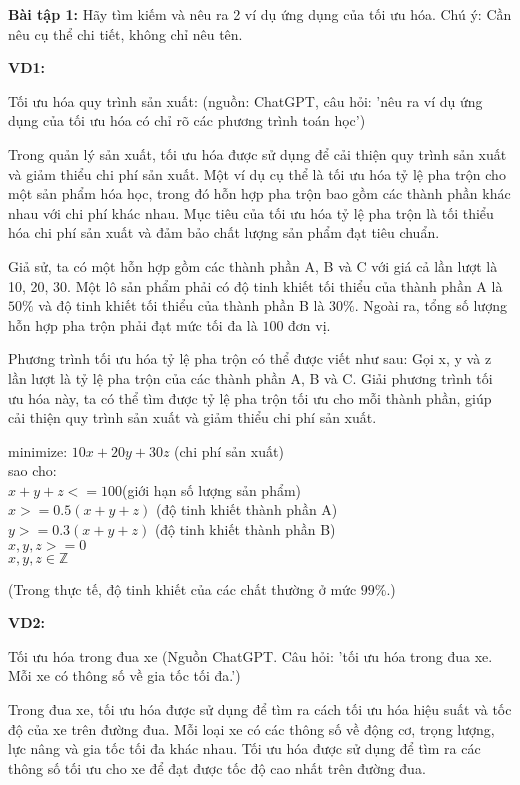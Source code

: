 \textbf{Bài tập 1:}
Hãy tìm kiếm và nêu ra 2 ví dụ ứng dụng của tối ưu hóa.
Chú ý: Cần nêu cụ thể chi tiết, không chỉ nêu tên.

\textbf{VD1:} 

Tối ưu hóa quy trình sản xuất: (nguồn: ChatGPT, câu hỏi: 'nêu ra ví dụ
 ứng dụng của tối ưu hóa có chỉ rõ các phương trình toán học')

Trong quản lý sản xuất, tối ưu hóa được 
sử dụng để cải thiện quy trình sản xuất và giảm thiểu chi phí sản xuất.
 Một ví dụ cụ thể là tối ưu hóa tỷ lệ pha trộn cho một sản phẩm hóa học, 
 trong đó hỗn hợp pha trộn bao gồm các thành phần khác nhau với chi phí 
 khác nhau. Mục tiêu của tối ưu hóa tỷ lệ pha trộn là tối thiểu hóa chi
phí sản xuất và đảm bảo chất lượng sản phẩm đạt tiêu chuẩn.

Giả sử, ta có một hỗn hợp gồm các thành phần A, B và C với giá
 cả lần lượt là 10, 20, 30. 
 Một lô sản phẩm phải có độ tinh khiết tối thiểu của thành phần A là $50\%$
  và độ tinh khiết tối thiểu của thành phần B là $30\%$.
 Ngoài ra, tổng số lượng hỗn hợp pha trộn phải đạt mức tối 
 đa là $100$ đơn vị.


Phương trình tối ưu hóa tỷ lệ pha trộn có thể được viết như sau:
Gọi x, y và z lần lượt là tỷ lệ pha trộn của các thành phần A, B và C.
 Giải phương trình tối ưu hóa này, ta có thể tìm được
  tỷ lệ pha trộn tối ưu cho mỗi thành phần, giúp cải thiện quy trình sản xuất và giảm thiểu chi phí sản xuất.

minimize: $10x + 20y + 30z$ (chi phí sản xuất)\\
sao cho:\\
$x + y + z <= 100 $(giới hạn số lượng sản phẩm)\\
$x >= 0.5(x+y+z)$ (độ tinh khiết thành phần A)\\
$y >= 0.3(x+y+z)$ (độ tinh khiết thành phần B)\\
$x,y,z >= 0 $\\
$x,y,z \in \mathbb{Z}$

(Trong thực tế, độ tinh khiết của các chất thường ở mức $99\%$.)

\textbf{VD2:} 

Tối ưu hóa trong đua xe (Nguồn ChatGPT. Câu hỏi: 
'tối ưu hóa trong đua xe. Mỗi xe có thông số về gia tốc tối đa.')

Trong đua xe, tối ưu hóa được sử dụng để tìm ra cách tối ưu hóa hiệu suất và tốc độ của xe trên đường đua. Mỗi loại xe có các thông số về động cơ, trọng lượng, lực nâng và gia tốc tối đa khác nhau. Tối ưu hóa được sử dụng để tìm ra các thông số tối ưu cho xe để đạt được tốc độ cao nhất trên đường đua.

